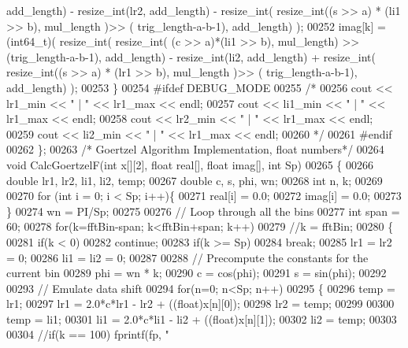 \begin{DoxyCode}
      add\_length) - resize_int(lr2, add\_length) - resize_int( resize_int((s >> a) * (li1 >> b), mul\_length )>> (
      trig\_length-a-b-1), add\_length) );
00252     imag[k] = (int64\_t)( resize_int( resize_int( (c >> a)*(li1 >> b), mul\_length) >> (trig\_length-a-b-1), 
      add\_length) - resize_int(li2, add\_length) + resize_int( resize_int((s >> a) * (lr1 >> b), mul\_length )>> (
      trig\_length-a-b-1), add\_length) );
00253   \}
00254 \textcolor{preprocessor}{  #ifdef DEBUG\_MODE}
00255     \textcolor{comment}{/*}
00256 \textcolor{comment}{    cout << lr1\_min << " | " << lr1\_max << endl;}
00257 \textcolor{comment}{    cout << li1\_min << " | " << lr1\_max << endl;}
00258 \textcolor{comment}{    cout << lr2\_min << " | " << lr1\_max << endl;}
00259 \textcolor{comment}{    cout << li2\_min << " | " << lr1\_max << endl;}
00260 \textcolor{comment}{    */}
00261 \textcolor{preprocessor}{  #endif}
00262 \};
00263 \textcolor{comment}{/* Goertzel Algorithm Implementation, float numbers*/}
00264 \textcolor{keywordtype}{void} CalcGoertzelF(\textcolor{keywordtype}{int} x[][2], \textcolor{keywordtype}{float} real[], \textcolor{keywordtype}{float} imag[], \textcolor{keywordtype}{int} Sp)
00265 \{
00266   \textcolor{keywordtype}{double} lr1, lr2, li1, li2, temp;
00267   \textcolor{keywordtype}{double} c, s, phi, wn;
00268   \textcolor{keywordtype}{int} n, k;
00269 
00270     \textcolor{keywordflow}{for} (\textcolor{keywordtype}{int} i = 0; i < Sp; i++)\{
00271         real[i] = 0.0;
00272         imag[i] = 0.0;
00273     \}
00274   wn = PI/Sp;
00275 
00276   \textcolor{comment}{// Loop through all the bins}
00277   \textcolor{keywordtype}{int} span = 60;
00278   \textcolor{keywordflow}{for}(k=fftBin-span; k<fftBin+span; k++)
00279   \textcolor{comment}{//k = fftBin;}
00280   \{
00281       \textcolor{keywordflow}{if}(k < 0)
00282         \textcolor{keywordflow}{continue};
00283       \textcolor{keywordflow}{if}(k >= Sp)
00284         \textcolor{keywordflow}{break};
00285     lr1 = lr2 = 0;
00286     li1 = li2 = 0;
00287 
00288     \textcolor{comment}{// Precompute the constants for the current bin}
00289     phi = wn * k;
00290     c = cos(phi);
00291     s = sin(phi);
00292 
00293     \textcolor{comment}{// Emulate data shift}
00294     \textcolor{keywordflow}{for}(n=0; n<Sp; n++)
00295     \{
00296       temp = lr1;
00297       lr1 = 2.0*c*lr1 - lr2 + ((float)x[n][0]);
00298       lr2 = temp;
00299 
00300       temp = li1;
00301       li1 = 2.0*c*li1 - li2 + ((float)x[n][1]);
00302       li2 = temp;
00303 
00304       \textcolor{comment}{//if(k == 100) fprintf(fp, "%
}
\end{DoxyCode}
